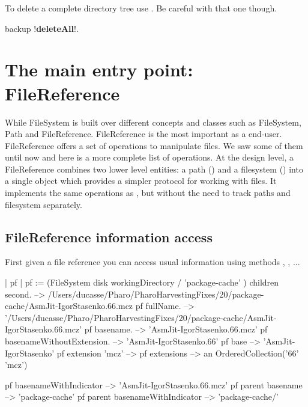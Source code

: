 \documentclass[a4paper,10pt,twoside]{book}
\begin{document}
To delete a complete directory tree use . Be careful with that one though.

\begin{code}{}
backup !\textbf{deleteAll}!.
\end{code}




\section{The main entry point: FileReference}
While FileSystem is built over different concepts and classes such as FileSystem, Path and FileReference. FileReference is the most important as
a end-user. FileReference offers a set of operations to manipulate files. We saw some of them until now and here is a more complete list of operations.
At the design level, a FileReference combines two lower level entities: a path () and a filesystem () into a single object which provides a simpler protocol for working with files. It implements the same operations as , but without the need to track paths and filesystem separately.

\subsection{FileReference information access}
First given a file reference you can access usual information using methods , , ...

\begin{code}{}
| pf |
pf := (FileSystem disk workingDirectory / 'package-cache' ) children second.
  -->  /Users/ducasse/Pharo/PharoHarvestingFixes/20/package-cache/AsmJit-IgorStasenko.66.mcz
pf fullName.
  --> '/Users/ducasse/Pharo/PharoHarvestingFixes/20/package-cache/AsmJit-IgorStasenko.66.mcz'
pf basename.
  --> 'AsmJit-IgorStasenko.66.mcz'  
pf basenameWithoutExtension. 
  -->	'AsmJit-IgorStasenko.66'
pf base 
	--> 'AsmJit-IgorStasenko'
pf extension 'mcz'
    -->
pf extensions
	--> an OrderedCollection('66' 'mcz')
\end{code}

\begin{code}{}
pf  basenameWithIndicator  
	--> 'AsmJit-IgorStasenko.66.mcz'
pf parent  basename 
	--> 'package-cache'
pf parent basenameWithIndicator  
	--> 'package-cache/'
\end{code}
\end{document}
